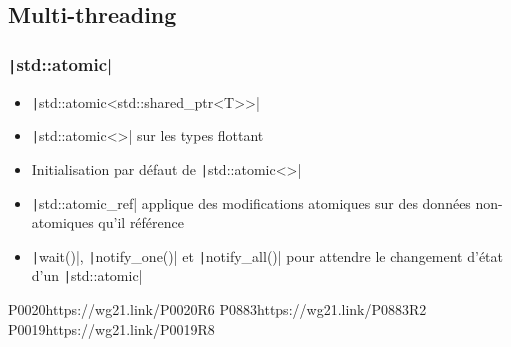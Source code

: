 \documentclass[C++.tex]{subfiles}
\begin{document}
\subsection*{Multi-threading}
\begin{frame}[fragile]
	\frametitle{\texttt|std::atomic|}
	\begin{itemize}
		\item \texttt|std::atomic<std::shared_ptr<T>>|
		\item \texttt|std::atomic<>| sur les types flottant
		\item Initialisation par défaut de \texttt|std::atomic<>|
		\item \texttt|std::atomic_ref| applique des modifications atomiques sur des données non-atomiques qu'il référence
		\item \texttt|wait()|, \texttt|notify_one()| et \texttt|notify_all()| pour attendre le changement d'état d'un \texttt|std::atomic|
	\end{itemize}

		{P0020}{https://wg21.link/P0020R6}
		{P0883}{https://wg21.link/P0883R2}
		{P0019}{https://wg21.link/P0019R8}
\end{frame}
\end{document}
